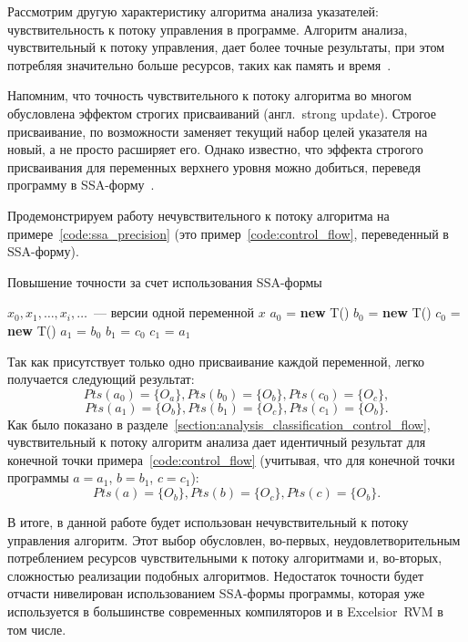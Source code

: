 \documentclass[14pt,titlepage]{extarticle}
\newcommand{\NEW}{\textbf{new }}
\newcommand{\eng}[1]{{\English#1}}
\newcommand{\engdef}[1]{(англ.~\eng{#1})}
\begin{document}
        Рассмотрим другую характеристику алгоритма анализа указателей:
        чувствительность к потоку управления в программе.
        Алгоритм анализа, чувствительный к потоку управления, дает более точные
        результаты, при этом потребляя значительно больше ресурсов, таких как
        память и
        время~\cite[раздел.~4.4]{hind_pointer_analysis_not_solved_yet}.

        Напомним, что точность чувствительного к потоку алгоритма во многом
        обусловлена эффектом строгих присваиваний \engdef{strong update}.
        Строгое присваивание, по возможности заменяет текущий набор целей
        указателя на новый, а не просто расширяет его.
        Однако известно, что эффекта строгого присваивания для переменных
        верхнего уровня можно добиться, переведя программу в
        SSA-форму~\cite{points_to_with_efficient_strong_updates}.

        Продемонстрируем работу нечувствительного к потоку алгоритма на
        примере~\ref{code:ssa_precision} (это пример~\ref{code:control_flow},
        переведенный в SSA-форму).
        \begin{algorithm}
          \caption{Повышение точности за счет использования SSA-формы}
          \label{code:ssa_precision}
          \begin{algorithmic}[1]
            \REQUIRE $x_0, x_1, \ldots, x_i, \ldots$~--- версии одной переменной $x$
            \STATE $a_0$ = \NEW T()
            \STATE $b_0$ = \NEW T()
            \STATE $c_0$ = \NEW T()
            \STATE $a_1$ = $b_0$
            \STATE $b_1$ = $c_0$
            \STATE $c_1$ = $a_1$
          \end{algorithmic}
        \end{algorithm}

        Так как присутствует только одно присваивание каждой переменной, легко
        получается следующий результат:
        \[Pts(a_0) = \{O_a\}, Pts(b_0) = \{O_b\}, Pts(c_0) = \{O_c\},\]
        \[Pts(a_1) = \{O_b\}, Pts(b_1) = \{O_c\}, Pts(c_1) = \{O_b\}.\]
        Как было показано в
        разделе~\ref{section:analysis_classification_control_flow},
        чувствительный к потоку алгоритм анализа дает идентичный результат для
        конечной точки примера~\ref{code:control_flow} (учитывая, что для
        конечной точки программы $a = a_1$, $b = b_1$, $c = c_1$):
        \[Pts(a) = \{O_b\}, Pts(b) = \{O_c\}, Pts(c) = \{O_b\}.\]

        В итоге, в данной работе будет использован нечувствительный к потоку
        управления алгоритм. Этот выбор обусловлен, во-первых,
        неудовлетворительным потреблением ресурсов чувствительными к потоку
        алгоритмами и, во-вторых, сложностью реализации подобных алгоритмов.
        Недостаток точности будет отчасти нивелирован использованием SSA-формы
        программы, которая уже используется в большинстве современных
        компиляторов и в \eng{Excelsior~RVM} в том числе.
\end{document}
